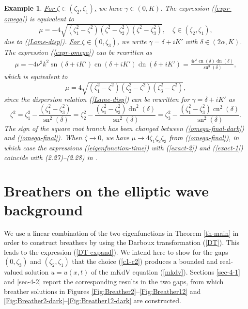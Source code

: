 \documentclass[12pt,reqno]{amsart}
\numberwithin{equation}{section}
\DeclareMathOperator{\sn}{sn}
\DeclareMathOperator{\cn}{cn}
\DeclareMathOperator{\dn}{dn}
\newtheorem{example}{Example}
\begin{document}
\begin{example}
\underline{For $\zeta \in (\zeta_2,\zeta_1)$,} we have $\gamma \in (0,K)$. The expression (\ref{expr-omega}) is equivalent to
\begin{equation}
\label{omega-final-dark}
\mu  = -4 \sqrt{(\zeta_1^2 - \zeta^2) (\zeta^2 - \zeta_2^2) (\zeta^2 - \zeta_3^2)},\quad \zeta \in (\zeta_2,\zeta_1),
\end{equation}
due to (\ref{Lame-disp}). \underline{For $\zeta \in (0,\zeta_3)$,} we write $\gamma = \delta + i K'$ with $\delta \in (2\alpha,K)$. The expression (\ref{expr-omega}) can be rewritten as 
\begin{align}
\label{expr-omega-bright}
\mu = -4 \nu^3 k^2 \sn(\delta + iK') \cn(\delta + iK') \dn(\delta + iK') = \frac{4 \nu^3 \cn(\delta) \dn(\delta)}{\sn^3(\delta)},
\end{align}
which is equivalent to 
\begin{equation}
\label{omega-final}
\mu  = 4 \sqrt{(\zeta_1^2 - \zeta^2) (\zeta_2^2 - \zeta^2) (\zeta_3^2 - \zeta^2)},
\end{equation}
since the dispersion relation (\ref{Lame-disp}) can be rewritten for $\gamma = \delta + i K'$ as
$$
\zeta^2 = \zeta_1^2 - \frac{(\zeta_1^2 - \zeta_3^2)}{\sn^2(\delta)} = 
\zeta_2^2 - \frac{(\zeta_1^2 - \zeta_3^2) \dn^2(\delta)}{\sn^2(\delta)} = 
\zeta_3^2 - \frac{(\zeta_1^2 - \zeta_3^2) \cn^2(\delta)}{\sn^2(\delta)}.
$$
The sign of the square root branch has been changed between (\ref{omega-final-dark}) and  (\ref{omega-final}). When $\zeta \to 0$, we have $\mu \to 4 \zeta_1 \zeta_2 \zeta_3$ from (\ref{omega-final}), in which case the expressions (\ref{eigenfunction-time}) with (\ref{exact-2}) and (\ref{exact-1}) coincide with (2.27)--(2.28) in \cite{AP25}.
\end{example}


\section{Breathers on the elliptic wave background}
\label{sec-4}

We use a linear combination of the two eigenfunctions in Theorem \ref{th-main} in order to construct breathers by using the Darboux transformation (\ref{DT}). This leads to the expression (\ref{DT-expand}). We intend here to show for the gaps $(0,\zeta_3)$ and $(\zeta_2,\zeta_1)$ that the choice (\ref{c1-c2}) produces a bounded and real-valued solution $u = u(x,t)$ of the mKdV equation (\ref{mkdv}). Sections \ref{sec-4-1} and \ref{sec-4-2} report the corresponding results in the two gaps, from which breather solutions in Figures \ref{Fig:Breather2}--\ref{Fig:Breather12} and \ref{Fig:Breather2-dark}--\ref{Fig:Breather12-dark} are constructed. 
\end{document}

